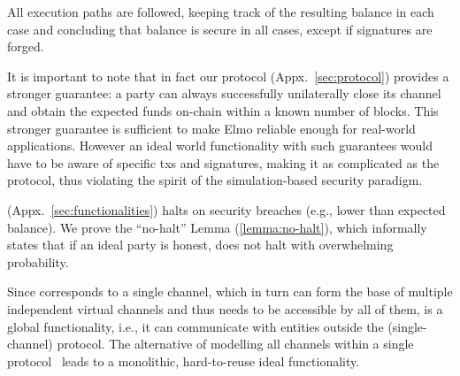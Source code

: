 \begin{proofsketch}
  All execution paths are followed, keeping track of the
  resulting balance in each case and concluding that balance is
  secure in all cases, except if signatures are forged.
\end{proofsketch}
    It is important to note that in fact our protocol \pchan
    (Appx.~\ref{sec:protocol})
    provides a stronger guarantee:
  a party can always successfully unilaterally close its channel
  and obtain the expected funds on-chain within a known number of blocks.
  This stronger guarantee is sufficient to make Elmo reliable
  enough for real-world applications. However an ideal world
  functionality with such guarantees would have to be aware of specific
  txs and signatures, making it as complicated
  as the protocol, thus violating the spirit of the simulation-based security
  paradigm.

  \fchan (Appx.~\ref{sec:functionalities})
  halts on security breaches (e.g., lower
  than expected balance).
  We prove the ``no-halt'' Lemma
  (\ref{lemma:no-halt}),
  which informally states
  that if an ideal party is honest, \fchan does not halt with overwhelming
  probability.

  Since \fchan corresponds to a single channel, which in turn can form the base
  of multiple independent virtual channels and thus needs to be accessible by
  all of them, \fchan is a global functionality, i.e., it can communicate with
  entities outside the (single-channel) protocol. The alternative of modelling
  all channels within a single protocol~\cite{DBLP:conf/csfw/KiayiasL20} leads
  to a monolithic, hard-to-reuse ideal functionality.

